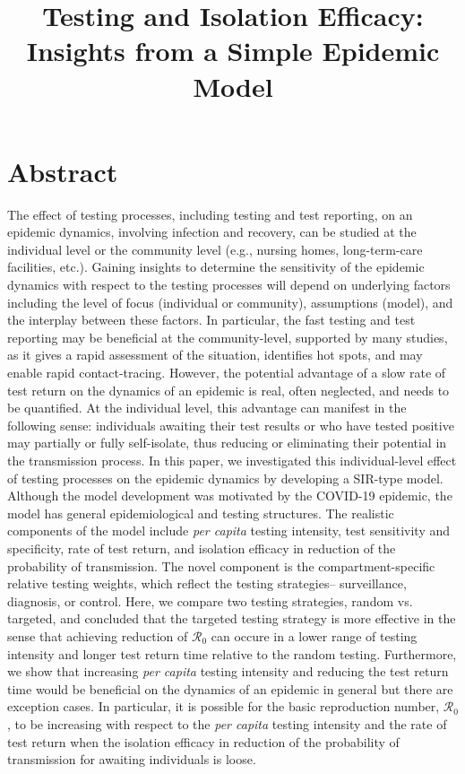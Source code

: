 \documentclass[12pt]{article}
\title{Testing and Isolation Efficacy: Insights from a Simple Epidemic Model}
\newcommand{\percap}{\emph{per capita}\xspace}
\newcommand{\Rnum}{\ensuremath{\mathcal{R}_0}}
\newcommand{\covid}{COVID-19\xspace}
\DeclareRobustCommand\_{\ifmmode\expandafter\subtxt\else\textunderscore\fi}
\theoremstyle{definition} %
\begin{document}
\maketitle

\linenumbers

\section{Abstract}

The effect of testing processes, including testing and test reporting, on an epidemic dynamics, involving infection and recovery, can be studied at the individual level or the community level (e.g., nursing homes, long-term-care facilities, etc.). 
Gaining insights to determine the sensitivity of the epidemic dynamics with respect to the testing processes will depend on underlying factors including the level of focus (individual or community), assumptions (model), and the interplay between these factors. 
In particular, the fast testing and test reporting may be beneficial at the community-level, supported by many studies, as it gives a rapid assessment of the situation, identifies hot spots, and may enable rapid contact-tracing. However, the potential advantage of a slow rate of test return on the dynamics of an epidemic is real, often neglected, and needs to be quantified. At the individual level, this advantage can manifest in the following sense: individuals awaiting their test results or who have tested positive may partially or fully self-isolate, thus reducing or eliminating their potential in the transmission process.
In this paper, we investigated this individual-level effect of testing processes on the epidemic dynamics by developing a SIR-type model.
Although the model development was motivated by the \covid epidemic, the model has general epidemiological and testing structures. The realistic components of the model include \percap testing intensity, test sensitivity and specificity, rate of test return, and isolation efficacy in reduction of the probability of transmission. The novel component is the compartment-specific relative testing weights, which reflect the testing strategies-- surveillance, diagnosis, or control.
Here, we compare two testing strategies, random vs. targeted, and concluded that the targeted testing strategy is more effective in the sense that achieving reduction of $\Rnum$ can occure in a lower range of testing intensity and longer test return time relative to the random testing. Furthermore, we show that increasing \percap testing intensity and reducing the test return time would be beneficial on the dynamics of an epidemic in general but there are exception cases. In particular, it is possible for the basic reproduction number, $\Rnum$, to be increasing with respect to the \percap testing intensity and the rate of test return when the isolation efficacy in reduction of the probability of transmission for awaiting individuals is loose.  
\end{document}
